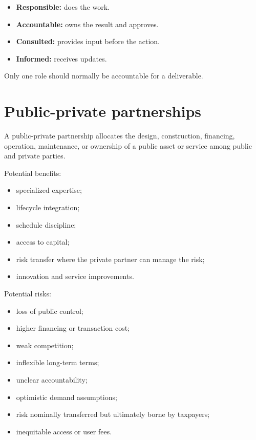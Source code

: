 \documentclass[11pt,letterpaper,oneside,openany]{book}
\begin{document}
\begin{itemize}
\item \textbf{Responsible:} does the work.
\item \textbf{Accountable:} owns the result and approves.
\item \textbf{Consulted:} provides input before the action.
\item \textbf{Informed:} receives updates.
\end{itemize}


Only one role should normally be accountable for a deliverable.


\section[Public-private partnerships]{Public-private partnerships}
A public-private partnership allocates the design, construction, financing, operation, maintenance, or ownership of a public asset or service among public and private parties.


Potential benefits:


\begin{itemize}
\item specialized expertise;
\item lifecycle integration;
\item schedule discipline;
\item access to capital;
\item risk transfer where the private partner can manage the risk;
\item innovation and service improvements.
\end{itemize}


Potential risks:


\begin{itemize}
\item loss of public control;
\item higher financing or transaction cost;
\item weak competition;
\item inflexible long-term terms;
\item unclear accountability;
\item optimistic demand assumptions;
\item risk nominally transferred but ultimately borne by taxpayers;
\item inequitable access or user fees.
\end{itemize}
\end{document}
